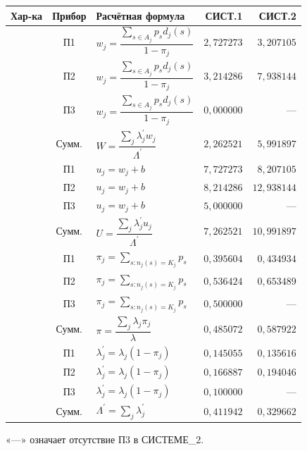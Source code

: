\documentclass[12pt,a4paper]{article}
\begin{document}
\begin{center}\small\setlength{\tabcolsep}{3pt}\renewcommand{\arraystretch}{2.0}
\begin{tabular}{|p{27mm}|c|>{\centering\arraybackslash}p{64mm}|r|r|}\hline
Хар-ка&Прибор&Расчётная формула&СИСТ.1&СИСТ.2\\\hline
{}&П1&$w_j=\dfrac{\sum_{s\in A_j}p_s d_j(s)}{1-\pi_j}$&$2{,}727273$&$3{,}207105$\\
&П2&$w_j=\dfrac{\sum_{s\in A_j}p_s d_j(s)}{1-\pi_j}$&$3{,}214286$&$7{,}938144$\\
&П3&$w_j=\dfrac{\sum_{s\in A_j}p_s d_j(s)}{1-\pi_j}$&$0{,}000000$&---\\
&Сумм.&$W=\dfrac{\sum_j\lambda_j^{\prime}w_j}{\Lambda^{\prime}}$&$2{,}262521$&$5{,}991897$\\\hline
{}&П1&$u_j=w_j+b$&$7{,}727273$&$8{,}207105$\\
&П2&$u_j=w_j+b$&$8{,}214286$&$12{,}938144$\\
&П3&$u_j=w_j+b$&$5{,}000000$&---\\
&Сумм.&$U=\dfrac{\sum_j\lambda_j^{\prime}u_j}{\Lambda^{\prime}}$&$7{,}262521$&$10{,}991897$\\\hline
{}&П1&$\pi_j=\sum_{s:n_j(s)=K_j}p_s$&$0{,}395604$&$0{,}434934$\\
&П2&$\pi_j=\sum_{s:n_j(s)=K_j}p_s$&$0{,}536424$&$0{,}653489$\\
&П3&$\pi_j=\sum_{s:n_j(s)=K_j}p_s$&$0{,}500000$&---\\
&Сумм.&$\pi=\dfrac{\sum_j\lambda_j\pi_j}{\lambda}$&$0{,}485072$&$0{,}587922$\\\hline
{}&П1&$\lambda_j^{\prime}=\lambda_j(1-\pi_j)$&$0{,}145055$&$0{,}135616$\\
&П2&$\lambda_j^{\prime}=\lambda_j(1-\pi_j)$&$0{,}166887$&$0{,}194046$\\
&П3&$\lambda_j^{\prime}=\lambda_j(1-\pi_j)$&$0{,}100000$&---\\
&Сумм.&$\Lambda^{\prime}=\sum_j\lambda_j^{\prime}$&$0{,}411942$&$0{,}329662$\\\hline
\end{tabular}\end{center}
\noindent\small «---» означает отсутствие П3 в СИСТЕМЕ\_2.\normalsize
\end{document}
